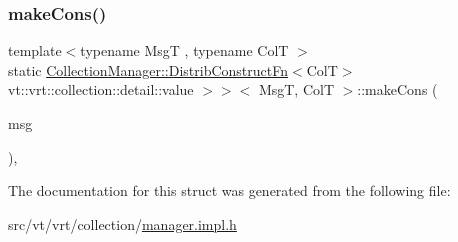 \subsubsection{\texorpdfstring{make\+Cons()}{makeCons()}}
{\footnotesize\ttfamily template$<$typename MsgT , typename ColT $>$ \\
static \hyperlink{structvt_1_1vrt_1_1collection_1_1_collection_manager_a9ef5ab71e344fdee8525c3f18241c305}{Collection\+Manager\+::\+Distrib\+Construct\+Fn}$<$ColT$>$ vt\+::vrt\+::collection\+::detail\+::value $>$$>$$<$ MsgT, ColT $>$\+::make\+Cons (\begin{DoxyParamCaption}\item[{\hyperlink{namespacevt_ab2b3d506ec8e8d1540aede826d84a239}{Msg\+Shared\+Ptr}$<$ MsgT $>$}]{msg }\end{DoxyParamCaption})\hspace{0.3cm}{\ttfamily [inline]}, {\ttfamily [static]}}



The documentation for this struct was generated from the following file\+:\begin{DoxyCompactItemize}
\item 
src/vt/vrt/collection/\hyperlink{vrt_2collection_2manager_8impl_8h}{manager.\+impl.\+h}\end{DoxyCompactItemize}
